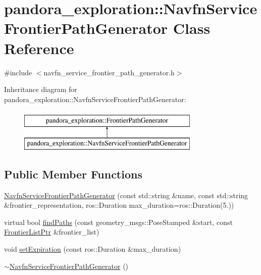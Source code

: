 \hypertarget{classpandora__exploration_1_1_navfn_service_frontier_path_generator}{\section{pandora\-\_\-exploration\-:\-:\-Navfn\-Service\-Frontier\-Path\-Generator \-Class \-Reference}
\label{classpandora__exploration_1_1_navfn_service_frontier_path_generator}
}


{\ttfamily \#include $<$navfn\-\_\-service\-\_\-frontier\-\_\-path\-\_\-generator.\-h$>$}

\-Inheritance diagram for pandora\-\_\-exploration\-:\-:\-Navfn\-Service\-Frontier\-Path\-Generator\-:\begin{figure}[H]
\begin{center}
\leavevmode
\includegraphics[height=2.000000cm]{classpandora__exploration_1_1_navfn_service_frontier_path_generator}
\end{center}
\end{figure}
\subsection*{\-Public \-Member \-Functions}
\begin{DoxyCompactItemize}
\item 
\hyperlink{classpandora__exploration_1_1_navfn_service_frontier_path_generator_a4ce5f1cee9c35c64cb662b4da90c4f37}{\-Navfn\-Service\-Frontier\-Path\-Generator} (const std\-::string \&name, const std\-::string \&frontier\-\_\-representation, ros\-::\-Duration max\-\_\-duration=ros\-::\-Duration(5.))
\item 
virtual bool \hyperlink{classpandora__exploration_1_1_navfn_service_frontier_path_generator_ae2cd2c3d535fec0eef9a642c7d2e146a}{find\-Paths} (const geometry\-\_\-msgs\-::\-Pose\-Stamped \&start, const \hyperlink{namespacepandora__exploration_a6f3b1959fca391e2ef3ac46b6e96be7a}{\-Frontier\-List\-Ptr} \&frontier\-\_\-list)
\item 
void \hyperlink{classpandora__exploration_1_1_navfn_service_frontier_path_generator_af1551d00389bf404d0f22999d75404b3}{set\-Expiration} (const ros\-::\-Duration \&max\-\_\-duration)
\item 
\hyperlink{classpandora__exploration_1_1_navfn_service_frontier_path_generator_a96e285ff88bda2f95010a7736e3f94ce}{$\sim$\-Navfn\-Service\-Frontier\-Path\-Generator} ()
\end{DoxyCompactItemize}


